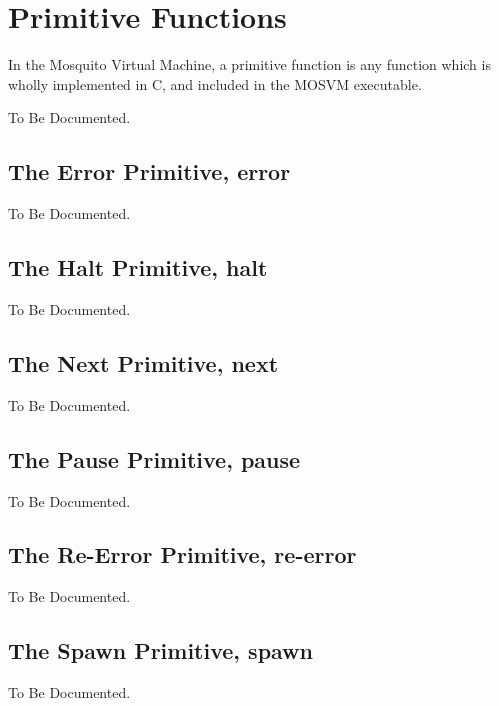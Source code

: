 \documentclass[notitlepage,oneside]{book}
\begin{document}
\chapter{Primitive Functions}
\label{primitives}

In the Mosquito Virtual Machine, a primitive function is any function which is wholly implemented in C, and included in the MOSVM executable.

To Be Documented.

\section{The Error Primitive, error}
\label{p-error}

To Be Documented.

\section{The Halt Primitive, halt}
\label{p-halt}

To Be Documented.

\section{The Next Primitive, next}
\label{p-next}

To Be Documented.

\section{The Pause Primitive, pause}
\label{p-pause}

To Be Documented.

\section{The Re-Error Primitive, re-error}
\label{p-re-error}

To Be Documented.

\section{The Spawn Primitive, spawn}
\label{p-spawn}

To Be Documented.
\end{document}
